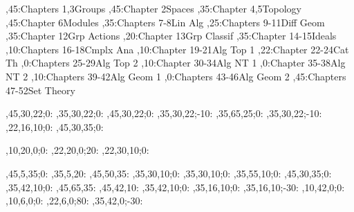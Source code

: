 
\setcounter{diagheight}{50}
\begin{chart}
,45:{Chapters 1,3}{Groups}{}
,45:{Chapter 2}{Spaces}{}
,35:{Chapter 4,5}{Topology}{}
,45:{Chapter 6}{Modules}{}
,35:{Chapters 7-8}{Lin Alg}{}
,25:{Chapters 9-11}{Diff Geom}{}
,35:{Chapter 12}{Grp Actions}{}
,20:{Chapter 13}{Grp Classif}{}
,35:{Chapter 14-15}{Ideals}{}
,10:{Chapters 16-18}{Cmplx Ana}{}
,10:{Chapter 19-21}{Alg Top 1}{}
,22:{Chapter 22-24}{Cat Th}{}
,0:{Chapters 25-29}{Alg Top 2}{}
,10:{Chapter 30-34}{Alg NT 1}{}
,0:{Chapter 35-38}{Alg NT 2}{}
,10:{Chapters 39-42}{Alg Geom 1}{}
,0:{Chapters 43-46}{Alg Geom 2}{}
,45:{Chapters 47-52}{Set Theory}{}

,45,30,22;0:   %
,35,30,22;0:   %
,45,30,22;0:   %
,35,30,22;-10: %
,35,65,25;0:   %
,35,30,22;-10: %
,22,16,10;0:   %
,45,30,35;0:   %

,10,20,0;0:    %
,22,20,0;20:   %
,22,30,10;0:   %

,45,5,35;0:    %
,35,5,20:      %
,45,50,35:     %
,35,30,10;0:   %
,35,30,10;0:   %
,35,55,10;0:   %
,45,30,35;0:   %
,35,42,10;0:   %
,45,65,35:     %
,45,42,10:     %
,35,42,10;0:   %
,35,16,10;0:   %
,35,16,10;-30: %
,10,42,0;0:    %
,10,6,0;0:     %
,22,6,0;80:     %
,35,42,0;-30:  %
\end{chart}
